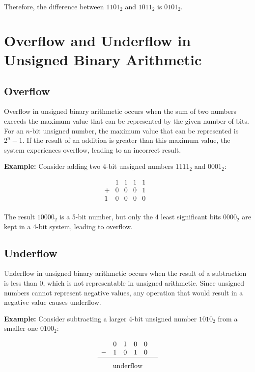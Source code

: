 \documentclass[12pt,openany]{book}
\begin{document}
	
	Therefore, the difference between $1101_2$ and $1011_2$ is $0101_2$.
	
	\section{Overflow and Underflow in Unsigned Binary Arithmetic}
	
	\subsection{Overflow}
	
	Overflow in unsigned binary arithmetic occurs when the sum of two numbers exceeds the maximum value that can be represented by the given number of bits. For an \(n\)-bit unsigned number, the maximum value that can be represented is \(2^n - 1\). If the result of an addition is greater than this maximum value, the system experiences overflow, leading to an incorrect result.
	
	\textbf{Example:} Consider adding two 4-bit unsigned numbers \(1111_2\) and \(0001_2\):
	
	\[
		\begin{array}{cccccc}
			  & 1 & 1 & 1 & 1 &   \\
			+ & 0 & 0 & 0 & 1 &   \\
			\hline
			1 & 0 & 0 & 0 & 0 &   \\
		\end{array}
	\]
	
	The result \(10000_2\) is a 5-bit number, but only the 4 least significant bits \(0000_2\) are kept in a 4-bit system, leading to overflow.
	\newpage
	\subsection{Underflow}
	
	Underflow in unsigned binary arithmetic occurs when the result of a subtraction is less than 0, which is not representable in unsigned arithmetic. Since unsigned numbers cannot represent negative values, any operation that would result in a negative value causes underflow.
	
	\textbf{Example:} Consider subtracting a larger 4-bit unsigned number \(1010_2\) from a smaller one \(0100_2\):
	
	\[
		\begin{array}{cccccc}
			  & 0 & 1 & 0 & 0 &   \\
			- & 1 & 0 & 1 & 0 &   \\
			\hline
		\end{array}\]
		\vspace{-15px}
		\begin{align*}
			\text{underflow} 
		\end{align*} 
		
\end{document}
